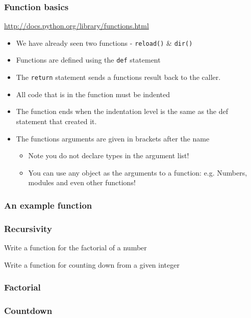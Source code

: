 \documentclass{beamer}
\begin{document}
\begin{frame}
\frametitle{Function basics}
\url{http://docs.python.org/library/functions.html}
\begin{itemize}
\item We have already seen two functions - \texttt{reload()} \& \texttt{dir()}
\item Functions are defined using the \texttt{def} statement
\item The \texttt{return} statement sends a functions result back to the caller.
\item All code that is in the function must be indented
\item The function ends when the indentation level is the same as the def statement that created it.
\item The functions arguments are given in brackets after the name
\begin{itemize}
\item Note you do not declare types in the argument list!
\item You can use any object as the arguments to a function: e.g. Numbers, modules and even other functions!
\end{itemize}
\end{itemize}
\end{frame}

\begin{frame}
\frametitle{An example function}

\end{frame}

\begin{frame}
\frametitle{Recursivity}
\begin{example}
Write a function for the factorial of a number
\end{example}
\begin{example}
Write a function for counting down from a given integer
\end{example}
\end{frame}

\begin{frame}
\frametitle{Factorial}

\end{frame}

\begin{frame}
\frametitle{Countdown}

\end{frame}
\end{document}
